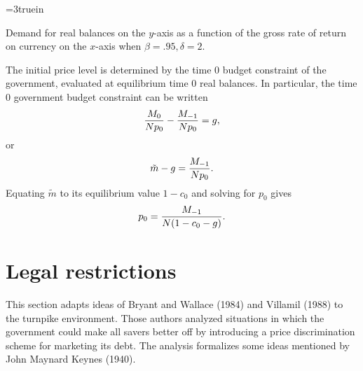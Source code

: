 

\centerline{\epsfxsize=3truein}
\caption{Demand for real balances on the $y$-axis as a function of the gross
rate of return on currency on the $x$-axis when $\beta =.95, \delta =2.$}
\endfigure


The initial price level is determined by the time $0$ budget constraint of the
government, evaluated at equilibrium time $0$ real balances.  In particular,
the time $0$ government budget constraint can be written
$$ {M_0 \over N p_0} - {M_{-1} \over N p_0} = g,$$
or
$$ \tilde m - g = {M_{-1} \over N p_0} .$$
Equating $\tilde m$ to its equilibrium value $1-c_0$ and solving
for $p_0$ gives
$$ p_0 = {M_{-1} \over N (1 - c_0 - g)}.$$
\section{Legal restrictions}

This section adapts ideas of Bryant and Wallace (1984)  and Villamil (1988) to the turnpike environment.
Those authors analyzed situations in which the government
could make all savers better off by introducing a price discrimination scheme for
marketing its debt.  The analysis formalizes some ideas mentioned
by John Maynard Keynes (1940).

